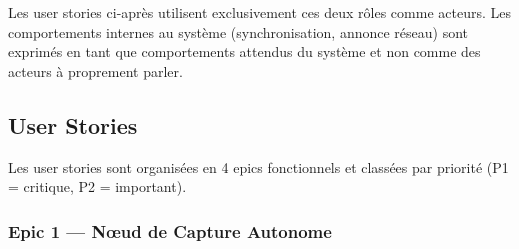 \documentclass[12pt,a4paper]{article}
\begin{document}
Les user stories ci-après utilisent exclusivement ces deux rôles comme acteurs. Les comportements internes au système (synchronisation, annonce réseau) sont exprimés en tant que comportements attendus du système et non comme des acteurs à proprement parler.

\subsection{User Stories}

Les user stories sont organisées en 4 epics fonctionnels et classées par priorité (P1 = critique, P2 = important).

\subsubsection{Epic 1 --- Nœud de Capture Autonome}
\end{document}
